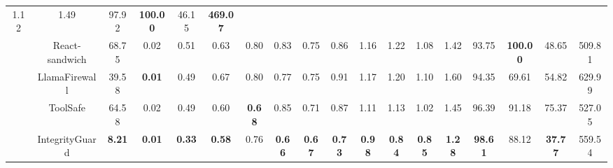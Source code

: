 \begin{table}[t]
\begin{tabular}{c|cccc|cccc|cccc|ccccc}
  1.12 &
  1.49 &
  97.92 &
  \textbf{100.00} &
  46.15 &
  \textbf{469.07} \\
 &
  React-sandwich &
  68.75 &
  0.02 &
  0.51 &
  0.63 &
  0.80 &
  0.83 &
  0.75 &
  0.86 &
  1.16 &
  1.22 &
  1.08 &
  1.42 &
  93.75 &
  \textbf{100.00} &
  48.65 &
  509.81 \\
 &
  LlamaFirewall &
  39.58 &
  \textbf{0.01} &
  0.49 &
  0.67 &
  0.80 &
  0.77 &
  0.75 &
  0.91 &
  1.17 &
  1.20 &
  1.10 &
  1.60 &
  94.35 &
  69.61 &
  54.82 &
  629.99 \\
 &
  ToolSafe &
  64.58 &
  0.02 &
  0.49 &
  0.60 &
  \textbf{0.68} &
  0.85 &
  0.71 &
  0.87 &
  1.11 &
  1.13 &
  1.02 &
  1.45 &
  96.39 &
  91.18 &
  75.37 &
  527.05 \\
 &
  IntegrityGuard &
  \textbf{8.21} &
  \textbf{0.01} &
  \textbf{0.33} &
  \textbf{0.58} &
  0.76 &
  \textbf{0.66} &
  \textbf{0.67} &
  \textbf{0.73} &
  \textbf{0.98} &
  \textbf{0.84} &
  \textbf{0.85} &
  \textbf{1.28} &
  \textbf{98.61} &
  88.12 &
  \textbf{37.77} &
  559.54 \\ \midrule \midrule
\end{tabular}
\end{table}
